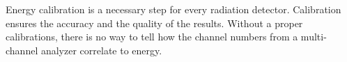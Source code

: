 Energy calibration is a necessary step for every radiation detector. Calibration ensures the accuracy and the quality of the results. Without a proper calibrations, there is no way to tell how the channel numbers from a multi-channel analyzer correlate to energy. 
